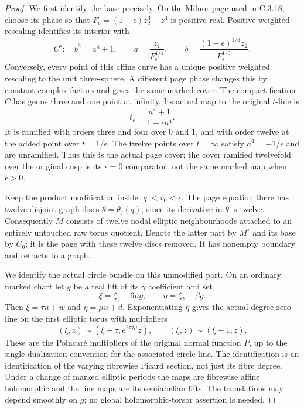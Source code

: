 \begin{proof}
We first identify the base precisely. On the Milnor page used in
C.3.18, choose its phase so that
$F_\epsilon=(1-\epsilon)z_2^3-z_1^4$ is positive real.
Positive weighted rescaling identifies its interior with
\[
 C^\circ:\quad b^3=a^4+1,
 \qquad
 a=\frac{z_1}{F_\epsilon^{1/4}},\qquad
 b=\frac{(1-\epsilon)^{1/3}z_2}{F_\epsilon^{1/3}}.
\]
Conversely, every point of this affine curve has a unique
positive weighted rescaling to the unit three-sphere. A different
page phase changes this by constant complex factors and gives
the same marked cover. The compactification $C$ has genus three
and one point at infinity. Its actual map to the original
$t$-line is
\[
 t_\epsilon=\frac{a^4+1}{1+\epsilon a^4}.
\]
It is ramified with orders three and four over $0$ and $1$,
and with order twelve at the added point over $t=1/\epsilon$.
The twelve points over $t=\infty$ satisfy
$a^4=-1/\epsilon$ and are unramified. Thus this is the
actual page cover; the cover ramified twelvefold over the
original cusp is its $\epsilon=0$ comparator, not the same
marked map when $\epsilon>0$.

Keep the product modification inside $|q|<r_0<\epsilon$.
The page equation there has twelve disjoint graph discs
$\theta=\theta_j(q)$, since its derivative in $\theta$ is
twelve. Consequently $M$ consists of twelve nodal elliptic
neighbourhoods attached to an entirely untouched raw torus
quotient. Denote the latter part by $M^\circ$ and its base by
$C_0$; it is the page with these twelve discs removed. It has
nonempty boundary and retracts to a graph.

We identify the actual circle bundle on this unmodified part.
On an ordinary marked chart let $g$ be a real lift of its
$\gamma$ coefficient and set
\[
 \xi=\zeta_1-6\mu g,\qquad
 \eta=\zeta_2-\beta g.
\]
Then $\xi=\tau u+w$ and $\eta=\mu u+d$. Exponentiating
$\eta$ gives the actual degree-zero line on the first elliptic
torus with multipliers
\[
 (\xi,z)\sim(\xi+\tau,e^{2\pi i\mu}z),\qquad
 (\xi,z)\sim(\xi+1,z).
\]
These are the Poincar\'e multipliers of the original normal
function $P$, up to the single dualization convention for the
associated circle line. The identification is an identification
of the varying fibrewise Picard section, not just its fibre
degree. Under a change of marked elliptic periods the maps are
fibrewise affine holomorphic and the line maps are its
semiabelian lifts. The translations may depend smoothly on
$g$; no global holomorphic-torsor assertion is needed.


\end{proof}
